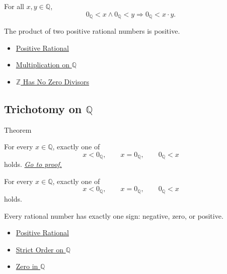 \begin{remark*}
For all $x,y\in\mathbb{Q}$,
\[
0_{\mathbb{Q}}<x\land 0_{\mathbb{Q}}<y
\Longrightarrow
0_{\mathbb{Q}}<x\cdot y.
\]
\end{remark*}

\begin{remark*}[Interpretation]
The product of two positive rational numbers is positive.
\end{remark*}

\begin{dependencies}
\begin{itemize}
  \item \hyperref[def:positive-rational]{Positive Rational}
  \item \hyperref[def:multiplication-on-q-classes]{Multiplication on $\mathbb{Q}$}
  \item \hyperref[thm:z-has-no-zero-divisors]{$\mathbb{Z}$ Has No Zero Divisors}
\end{itemize}
\end{dependencies}

\subsection*{\texorpdfstring{Trichotomy on $\mathbb{Q}$}{Trichotomy on Q}}

\begin{theorembox}{Theorem}
\begin{theorem}
\label{thm:sign-trichotomy-on-q}
For every $x\in\mathbb{Q}$, exactly one of
\[
x<0_{\mathbb{Q}},\qquad x=0_{\mathbb{Q}},\qquad 0_{\mathbb{Q}}<x
\]
holds.
\hyperref[prf:sign-trichotomy-on-q]{\textit{Go to proof.}}
\end{theorem}
\end{theorembox}

\begin{remark*}
For every $x\in\mathbb{Q}$, exactly one of
\[
x<0_{\mathbb{Q}},\qquad x=0_{\mathbb{Q}},\qquad 0_{\mathbb{Q}}<x
\]
holds.
\end{remark*}

\begin{remark*}[Interpretation]
Every rational number has exactly one sign: negative, zero, or positive.
\end{remark*}

\begin{dependencies}
\begin{itemize}
  \item \hyperref[def:positive-rational]{Positive Rational}
  \item \hyperref[def:strict-order-on-q]{Strict Order on $\mathbb{Q}$}
  \item \hyperref[def:zero-in-q]{Zero in $\mathbb{Q}$}
\end{itemize}
\end{dependencies}

